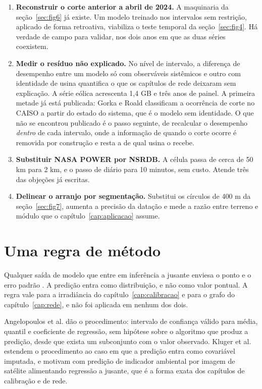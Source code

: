 \begin{enumerate}[leftmargin=1.2em,itemsep=0.35em]
\item \textbf{Reconstruir o corte anterior a abril de 2024.} A maquinaria da
seção~\ref{sec:fig6} já existe. Um modelo treinado nos intervalos sem restrição,
aplicado de forma retroativa, viabiliza o teste temporal da
seção~\ref{sec:fig4}. Há verdade de campo para validar, nos dois anos em que as
duas séries coexistem.

\item \textbf{Medir o resíduo não explicado.} No nível de intervalo, a diferença
de desempenho entre um modelo só com observáveis sistêmicos e outro com
identidade de usina quantifica o que os capítulos de rede deixaram sem
explicação. A série eólica acrescenta 1,4 GB e três anos de painel. A primeira
metade já está publicada: Gorka e Roald \cite{gorka2024} classificam a
ocorrência de corte no CAISO a partir do estado do sistema, que é o modelo sem
identidade. O que não se encontrou publicado é o passo seguinte, de recalcular o
desempenho \emph{dentro} de cada intervalo, onde a informação de quando o corte
ocorre é removida por construção e resta a de qual usina o recebe.

\item \textbf{Substituir NASA POWER por NSRDB.} A célula passa de cerca de 50 km
para 2 km, e o passo de diário para 10 minutos, sem custo. Atende três das
objeções já escritas.

\item \textbf{Delinear o arranjo por segmentação.} Substitui os círculos de
400 m da seção~\ref{sec:fig7}, aumenta a precisão da datação e mede a razão
entre terreno e módulo que o capítulo~\ref{cap:aplicacao} assume.
\end{enumerate}

\section{Uma regra de método}

Qualquer saída de modelo que entre em inferência a jusante enviesa o ponto e o
erro padrão \cite{proctor2023}. A predição entra como distribuição, e não como
valor pontual. A regra vale para a irradiância do capítulo~\ref{cap:calibracao}
e para o grafo do capítulo~\ref{cap:rede}, e não foi aplicada em nenhum dos
dois.

 Angelopoulos et al. \cite{angelopoulos2023}
dão o procedimento: intervalo de confiança válido para média, quantil e
coeficiente de regressão, sem hipótese sobre o algoritmo que produz a predição,
desde que exista um subconjunto com o valor observado. Kluger et al.
\cite{kluger2025} estendem o procedimento ao caso em que a predição entra como
covariável imputada, e motivam com predição de indicador ambiental por imagem de
satélite alimentando regressão a jusante, que é a forma exata dos capítulos de
calibração e de rede.

